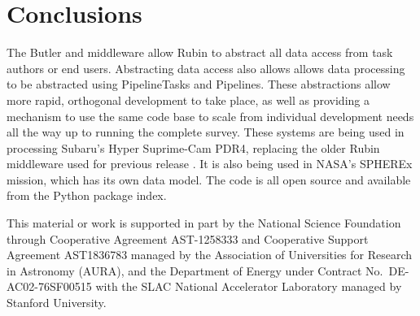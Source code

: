 \documentclass[11pt,twoside]{article}
\begin{document}
\section{Conclusions}
The Butler and middleware allow Rubin to abstract all data access from task authors or end users. Abstracting data access also allows allows data processing to be abstracted using PipelineTasks and Pipelines. These abstractions allow more rapid, orthogonal development to take place, as well as providing a mechanism to use the same code base to scale from individual development needs all the way up to running the complete survey. These systems are being used in processing Subaru's Hyper Suprime-Cam PDR4, replacing the older Rubin middleware used for previous release \citet{2018PASJ...70S...5B}. It is also being used in NASA's SPHEREx mission, which has its own data model. The code is all open source and available from the Python package index.

\acknowledgments This material or work is supported in part by the National Science Foundation through Cooperative Agreement AST-1258333 and Cooperative Support Agreement AST1836783 managed by the Association of Universities for Research in Astronomy (AURA), and the Department of Energy under Contract No.\ DE-AC02-76SF00515 with the SLAC National Accelerator Laboratory managed by Stanford University.


\end{document}
